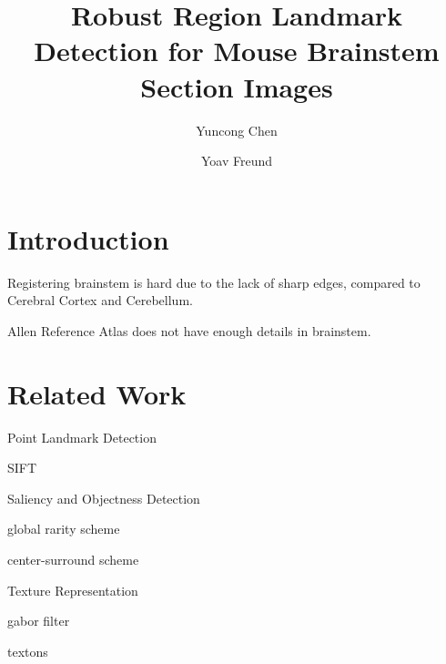 \documentclass{llncs}
\begin{document}
%
%
\title{Robust Region Landmark Detection for Mouse Brainstem Section Images}
%
%
\author{Yuncong Chen \and Yoav Freund}
%
%
%

\maketitle              %

\begin{abstract}

\end{abstract}
%
\section{Introduction}
%

Registering brainstem is hard due to the lack of sharp edges, compared to Cerebral Cortex and Cerebellum.

Allen Reference Atlas does not have enough details in brainstem.



\begin{figure}
\vspace{2.5cm}
\caption{}
\end{figure}


\section{Related Work}

\begin{description}

\item{Point Landmark Detection}

SIFT

\item{Saliency and Objectness Detection}

global rarity scheme

center-surround scheme

\item{Texture Representation}

gabor filter

textons

\end{description}
\end{document}

